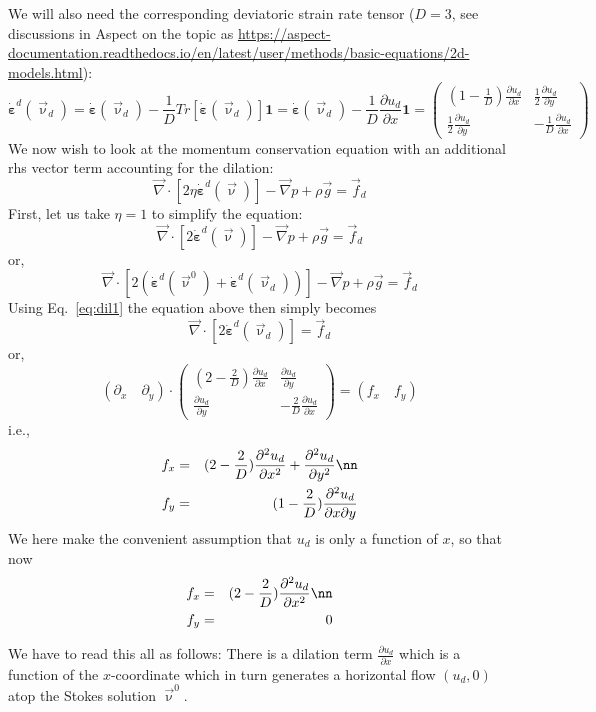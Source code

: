 We will also need the corresponding deviatoric strain rate tensor ($D=3$, see discussions in Aspect on the topic
as \url{https://aspect-documentation.readthedocs.io/en/latest/user/methods/basic-equations/2d-models.html}):
\[
\dot{\bm \varepsilon}^d(\vec\upnu_d)
=\dot{\bm \varepsilon}(\vec\upnu_d) - \frac{1}{D} Tr[\dot{\bm \varepsilon}(\vec\upnu_d)] {\bm 1}
=\dot{\bm \varepsilon}(\vec\upnu_d) - \frac{1}{D} \frac{\partial u_d}{\partial x} {\bm 1}
=
\begin{pmatrix}
(1-\frac1D) \frac{\partial u_d}{\partial x} & \frac12 \frac{\partial u_d}{\partial y}  \\
\frac12 \frac{\partial u_d}{\partial y}  & -\frac1D \frac{\partial u_d}{\partial x}
\end{pmatrix}
\]
We now wish to look at the momentum conservation equation with an additional rhs vector term accounting for the dilation:
\[
\vec\nabla \cdot [2 \eta \dot{\bm \varepsilon}^d(\vec\upnu)]  -\vec\nabla p + \rho \vec{g} = \vec{f}_d
\]
First, let us take $\eta=1$ to simplify the equation:
\[
\vec\nabla \cdot [2  \dot{\bm \varepsilon}^d(\vec\upnu)]  -\vec\nabla p + \rho \vec{g} = \vec{f}_d
\]
or,
\[
\vec\nabla \cdot [2  (\dot{\bm \varepsilon}^d(\vec\upnu^0) +\dot{\bm \varepsilon}^d(\vec\upnu_d) ) ]  
-\vec\nabla p + \rho \vec{g} = \vec{f}_d
\]
Using Eq.~\eqref{eq:dil1} the equation above then simply becomes
\[
\vec\nabla \cdot [2  \dot{\bm \varepsilon}^d(\vec\upnu_d)  ]  = \vec{f}_d
\]
or, 
\[
(\partial_x \quad \partial_y) \cdot \begin{pmatrix}
(2-\frac2D) \frac{\partial u_d}{\partial x} &  \frac{\partial u_d}{\partial y}  \\
 \frac{\partial u_d}{\partial y}  & -\frac2D \frac{\partial u_d}{\partial x}
\end{pmatrix}
=(f_x \quad f_y)
\]
i.e., 
\begin{eqnarray}
f_x &=& (2-\frac2D) \frac{\partial^2 u_d}{\partial x^2}  +  \frac{\partial^2 u_d}{\partial y^2} \nn\\
f_y &=& (1-\frac2D) \frac{\partial^2 u_d}{\partial x \partial y}  \label{f175:fxfy}
\end{eqnarray}
We here make the convenient assumption that $u_d$ is only a function of $x$, so that now
\begin{eqnarray}
f_x &=& (2-\frac2D) \frac{\partial^2 u_d}{\partial x^2}   \nn\\
f_y &=& 0
\end{eqnarray}

We have to read this all as follows: There is a dilation term $\frac{\partial u_d}{\partial x}$ 
which is a function of the $x$-coordinate which in turn generates a horizontal flow $(u_d,0)$
atop the Stokes solution $\vec\upnu^0$.

